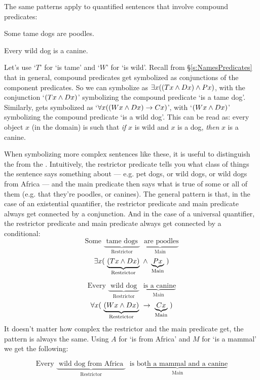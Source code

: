 The same patterns apply to quantified sentences that involve compound predicates:
	\begin{earg}
		\item[\ex{quan3}] Some tame dogs are poodles.
		\item[\ex{quan4}] Every wild dog is a canine.
	\end{earg}
Let's use `$T$' for `\blank is tame' and `$W$' for `\blank is wild'.  Recall from \S\ref{s:NamesPredicates} that in general, compound predicates get symbolized as conjunctions of the component predicates.  So we can symbolize  as $\exists x((Tx \wedge Dx) \wedge Px)$, with the conjunction `$(Tx \wedge Dx)$' symbolizing the compound predicate `is a tame dog'.  Similarly,  gets symbolized as `$\forall x((Wx \wedge Dx) \rightarrow Cx)$', with `$(Wx \wedge Dx)$' symbolizing the compound predicate `is a wild dog'.  This can be read as: every object $x$ (in the domain) is such that \emph{if} $x$ is wild and $x$ is a dog, \emph{then} $x$ is a canine.

When symbolizing more complex sentences like these, it is useful to distinguish the  from the .  Intuitively, the restrictor predicate tells you what class of things the sentence says something about --- e.g. pet dogs, or wild dogs, or wild dogs from Africa --- and the main predicate then says what is true of some or all of them (e.g. that they're poodles, or canines).  The general pattern is that, in the case of an existential quantifier, the restrictor predicate and main predicate always get connected by a conjunction.  And in the case of a universal quantifier, the restrictor predicate and main predicate always get connected by a conditional:
$$\text{Some }\underbrace{\text{ tame dogs }}_{\text{Restrictor}}\  \underbrace{\text{ are poodles}}_{\text{Main}}$$
$$\exists x (\ \underbrace{(Tx \eand Dx)}_{\text{Restrictor}} \ \eand \ \underbrace{Px}_{\text{Main}} \ )$$

$$\text{Every }\underbrace{\text{ wild dog }}_{\text{Restrictor}} \ \underbrace{\text{ is a canine}}_{\text{Main}}$$
$$\forall x( \ \underbrace{(Wx \eand Dx)}_{\text{Restrictor}} \ \eif \  \underbrace{Cx}_{\text{Main}} \ )$$
It doesn't matter how complex the restrictor and the main predicate get, the pattern is always the same.  Using $A$ for `\blank is from Africa' and $M$ for `\blank is a mammal' we get the following:

$$\text{Every }\underbrace{\text{ wild dog from Africa }}_{\text{Restrictor}} \ \underbrace{\text{ is both a mammal and a canine}}_{\text{Main}}$$

